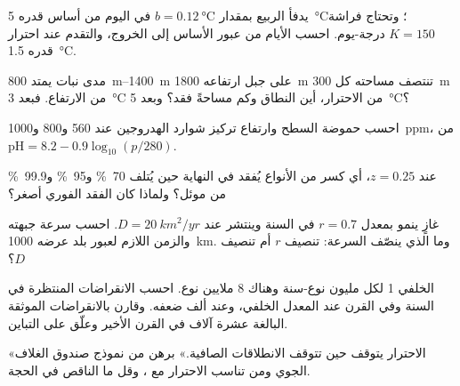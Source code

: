 \begin{exercise}[$\star\star$]\label{exo:b2:global-change:6}
يدفأ الربيع بمقدار $b = \qty{0.12}{\celsius}$ في اليوم من أساس قدره
\qty{5}{\celsius}؛ وتحتاج فراشة $K = 150$ درجة-يوم. احسب
الأيام من عبور الأساس إلى الخروج، والتقدم عند
احترار قدره \qty{1.5}{\celsius}.
\end{exercise}

\begin{exercise}[$\star\star$]\label{exo:b2:global-change:7}
مدى نبات يمتد \qtyrange{800}{1400}{m} على جبل
ارتفاعه \qty{1800}{m} تنتصف مساحته كل \qty{300}{m} من الارتفاع.
فبعد \qty{3}{\celsius} من الاحترار، أين النطاق وكم
مساحةً فقد؟ وبعد \qty{5}{\celsius}؟
\end{exercise}

\begin{exercise}[$\star\star$]\label{exo:b2:global-change:8}
احسب حموضة السطح وارتفاع تركيز شوارد الهدروجين
عند 560 و800 و\qty{1000}{ppm}، من $\mathrm{pH} = 8.2 -
0.9\log_{10}(p/280)$.
\end{exercise}

\begin{exercise}[$\star\star$]\label{exo:b2:global-change:9}
عند $z = 0.25$، أي كسر من الأنواع يُفقد في النهاية حين
يُتلف \qty{70}{\%} و\qty{95}{\%} و\qty{99.9}{\%} من موئل؟
ولماذا كان الفقد الفوري أصغر؟
\end{exercise}

\begin{exercise}[$\star\star\star$]\label{exo:b2:global-change:10}
غازٍ ينمو بمعدل $r = 0.7$ في السنة وينتشر عند $D =
\qty{20}{km^2/yr}$. احسب سرعة جبهته والزمن اللازم لعبور
بلد عرضه \qty{1000}{km}. وما الذي ينصّف السرعة: تنصيف $r$ أم
تنصيف $D$؟
\end{exercise}

\begin{exercise}[$\star\star\star$]\label{exo:b2:global-change:11}
 الخلفي 1 لكل مليون نوع-سنة
وهناك 8 ملايين نوع. احسب الانقراضات المنتظرة في
السنة وفي القرن عند المعدل الخلفي، وعند ألف ضعفه.
وقارن بالانقراضات الموثقة البالغة عشرة آلاف في القرن
الأخير وعلّق على التباين.
\end{exercise}

\begin{exercise}[$\star\star\star$]\label{exo:b2:global-change:12}
«الاحترار يتوقف حين تتوقف الانطلاقات الصافية.» برهن من نموذج
صندوق الغلاف الجوي ومن تناسب الاحترار مع
، وقل ما الناقص في الحجة.
\end{exercise}

